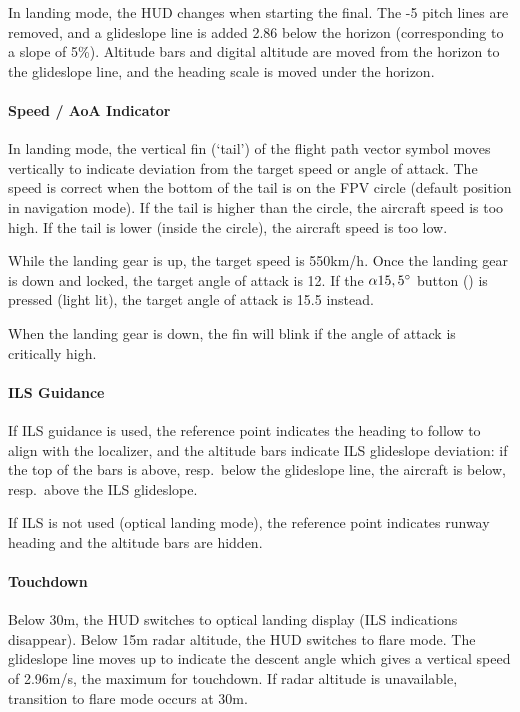 In landing mode, the HUD changes when starting the final.
The -5\textdegree{} pitch lines are removed,
and a glideslope line is added 2.86\textdegree{} below the horizon
(corresponding to a slope of 5\%).
Altitude bars and digital altitude are moved from the horizon to the glideslope line,
and the heading scale is moved under the horizon.

\paragraph{Speed / AoA Indicator}
In landing mode, the vertical fin (`tail') of the flight path vector symbol
moves vertically to indicate deviation from the target speed or angle of attack.
The speed is correct when the bottom of the tail is on the FPV circle
(default position in navigation mode).
If the tail is higher than the circle, the aircraft speed is too high.
If the tail is lower (inside the circle), the aircraft speed is too low.

While the landing gear is up, the target speed is 550km/h.
Once the landing gear is down and locked, the target angle of attack is 12\textdegree{}.
If the $\alpha 15,5\degree$ button
() is pressed (light lit),
the target angle of attack is 15.5\textdegree{} instead.

When the landing gear is down, the fin will blink if the angle of attack is critically high.

\paragraph{ILS Guidance}
If ILS guidance is used, the reference point indicates the heading to follow to align with the localizer,
and the altitude bars indicate ILS glideslope deviation:
if the top of the bars is above, resp.\ below the glideslope line,
the aircraft is below, resp.\ above the ILS glideslope.

If ILS is not used (optical landing mode),
the reference point indicates runway heading and the altitude bars are hidden.

\paragraph{Touchdown}
Below 30m, the HUD switches to optical landing display (ILS indications disappear).
Below 15m radar altitude, the HUD switches to flare mode.
The glideslope line moves up to indicate the descent angle
which gives a vertical speed of 2.96m/s, the maximum for touchdown.
If radar altitude is unavailable, transition to flare mode occurs at 30m.

